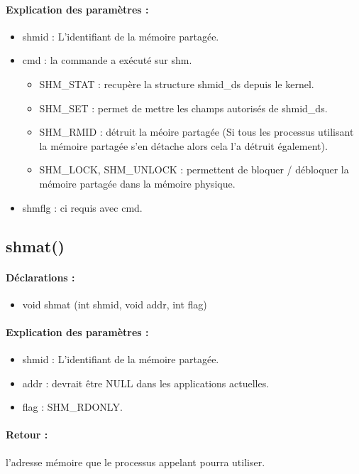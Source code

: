 \documentclass{article}[12pt]
\begin{document}
\paragraph{Explication des paramètres : }
\begin{itemize}
\item shmid : L'identifiant de la mémoire partagée. 
\item cmd : la commande a exécuté sur shm. 
\begin{itemize}
	\item SHM\_STAT : recupère la structure shmid\_ds depuis le kernel.
    \item SHM\_SET : permet de mettre les champs autorisés de shmid\_ds.
    \item SHM\_RMID : détruit la méoire partagée (Si tous les processus utilisant la mémoire partagée s'en détache alors cela l'a détruit également).
    \item SHM\_LOCK, SHM\_UNLOCK : permettent de bloquer / débloquer la mémoire partagée dans la mémoire physique.
\end{itemize}
\item shmflg : ci requis avec cmd.   
\end{itemize}
\subsection{shmat()}
\paragraph{Déclarations : }
\begin{itemize}
	\item void \*shmat (int shmid, void \*addr, int flag)
\end{itemize}
\paragraph{Explication des paramètres : }
\begin{itemize}
\item shmid : L'identifiant de la mémoire partagée. 
\item addr : devrait être NULL dans les applications actuelles.
\item flag : SHM\_RDONLY.  
\end{itemize}
\paragraph{Retour : } l'adresse mémoire que le processus appelant pourra utiliser.
\end{document}
